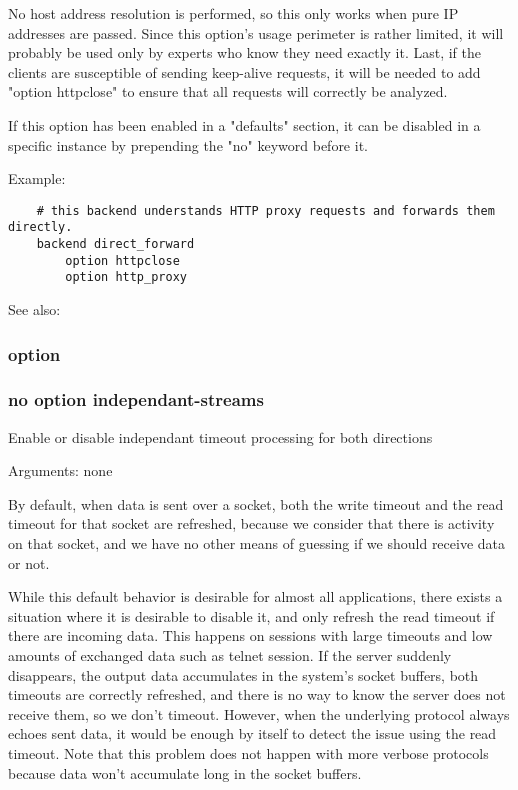 {  No host address resolution is performed, so this only works when pure IP
  addresses are passed. Since this option's usage perimeter is rather limited,
  it will probably be used only by experts who know they need exactly it. Last,
  if the clients are susceptible of sending keep-alive requests, it will be
  needed to add "option httpclose" to ensure that all requests will correctly
  be analyzed.

  If this option has been enabled in a "defaults" section, it can be disabled
  in a specific instance by prepending the "no" keyword before it.

  Example:
\begin{verbatim}
    # this backend understands HTTP proxy requests and forwards them directly.
    backend direct_forward
        option httpclose
        option http_proxy
\end{verbatim}

  See also: 

\subsubsection[independant-streams]{option }
\subsubsection*{no option independant-streams}


  Enable or disable independant timeout processing for both directions


  Arguments: none

  By default, when data is sent over a socket, both the write timeout and the
  read timeout for that socket are refreshed, because we consider that there is
  activity on that socket, and we have no other means of guessing if we should
  receive data or not.

  While this default behavior is desirable for almost all applications, there
  exists a situation where it is desirable to disable it, and only refresh the
  read timeout if there are incoming data. This happens on sessions with large
  timeouts and low amounts of exchanged data such as telnet session. If the
  server suddenly disappears, the output data accumulates in the system's
  socket buffers, both timeouts are correctly refreshed, and there is no way
  to know the server does not receive them, so we don't timeout. However, when
  the underlying protocol always echoes sent data, it would be enough by itself
  to detect the issue using the read timeout. Note that this problem does not
  happen with more verbose protocols because data won't accumulate long in the
  socket buffers.

}
